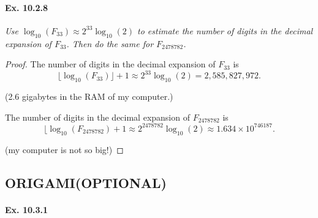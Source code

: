 \documentclass[11pt,a4paper]{article}
\begin{document}
\paragraph{Ex. 10.2.8}

{\it Use $\log_{10}(F_{33}) \approx 2^{33} \log_{10}(2)$ to estimate the number of digits in the decimal expansion of $F_{33}$. Then do the same for $F_{2478782}$.
}

\begin{proof} The number of digits in the decimal expansion of $F_{33}$ is $$\lfloor \log_{10}(F_{33}) \rfloor + 1  \approx  2^{33} \log_{10}(2)  = 2,585,827,972.$$

(2.6 gigabytes in the RAM of my computer.)

The number of digits in the decimal expansion of $F_{2478782}$ is $$\lfloor \log_{10}(F_{2478782}) + 1  \approx   2^{2478782} \log_{10}(2) \approx 1.634\times 10^{746187}.$$

(my computer is not so big!)
\end{proof}

\subsection{ORIGAMI(OPTIONAL)}

\paragraph{Ex. 10.3.1}
\end{document}
